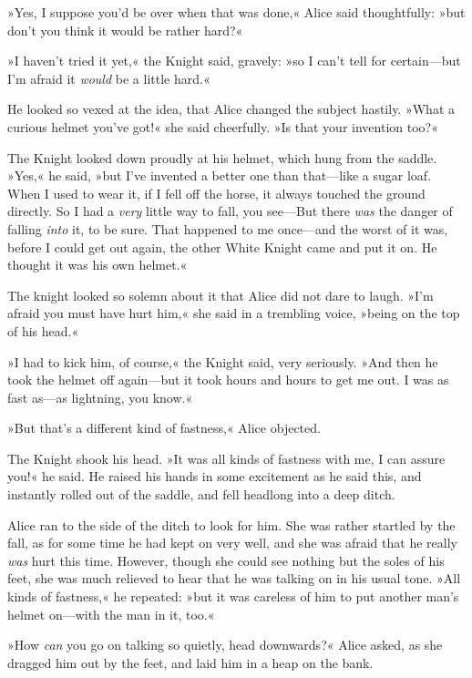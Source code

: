 »Yes, I suppose you'd be over when that was done,« Alice said thoughtfully: »but don't you think it would be rather hard?«

»I haven't tried it yet,« the Knight said, gravely: »so I can't tell for certain—but I'm afraid it \textit{would} be a little hard.«

He looked so vexed at the idea, that Alice changed the subject hastily. »What a curious helmet you've got!« she said cheerfully. »Is that your invention too?«

The Knight looked down proudly at his helmet, which hung from the saddle. »Yes,« he said, »but I've invented a better one than that—like a sugar loaf. When I used to wear it, if I fell off the horse, it always touched the ground directly. So I had a \textit{very} little way to fall, you see—But there \textit{was} the danger of falling \textit{into} it, to be sure. That happened to me once—and the worst of it was, before I could get out again, the other White Knight came and put it on. He thought it was his own helmet.«

The knight looked so solemn about it that Alice did not dare to laugh. »I'm afraid you must have hurt him,« she said in a trembling voice, »being on the top of his head.«

»I had to kick him, of course,« the Knight said, very seriously. »And then he took the helmet off again—but it took hours and hours to get me out. I was as fast as—as lightning, you know.«

»But that's a different kind of fastness,« Alice objected.

The Knight shook his head. »It was all kinds of fastness with me, I can assure you!« he said. He raised his hands in some excitement as he said this, and instantly rolled out of the saddle, and fell headlong into a deep ditch.

Alice ran to the side of the ditch to look for him. She was rather startled by the fall, as for some time he had kept on very well, and she was afraid that he really \textit{was} hurt this time. However, though she could see nothing but the soles of his feet, she was much relieved to hear that he was talking on in his usual tone. »All kinds of fastness,« he repeated: »but it was careless of him to put another man's helmet on—with the man in it, too.«

»How \textit{can} you go on talking so quietly, head downwards?« Alice asked, as she dragged him out by the feet, and laid him in a heap on the bank.

